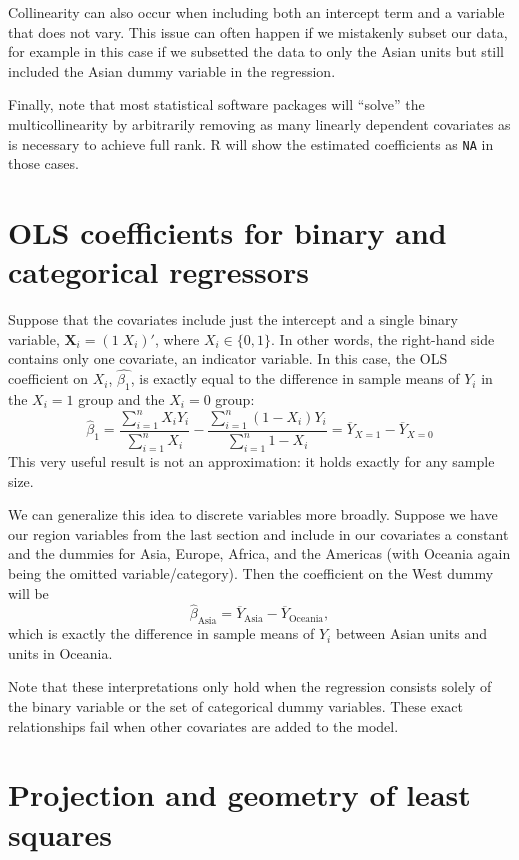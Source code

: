 \documentclass[
  13pt,
  letterpaper,
  DIV=11,
  numbers=noendperiod]{scrreprt}
\newcommand{\mb}{\symbf}
\newcommand{\X}{\mb{X}}
\theoremstyle{plain}
\theoremstyle{definition}
\theoremstyle{definition}
\theoremstyle{remark}
\begin{document}
Collinearity can also occur when including both an intercept term and a
variable that does not vary. This issue can often happen if we
mistakenly subset our data, for example in this case if we subsetted the
data to only the Asian units but still included the Asian dummy variable
in the regression.

Finally, note that most statistical software packages will ``solve'' the
multicollinearity by arbitrarily removing as many linearly dependent
covariates as is necessary to achieve full rank. R will show the
estimated coefficients as \texttt{NA} in those cases.

\section{OLS coefficients for binary and categorical
regressors}\label{ols-coefficients-for-binary-and-categorical-regressors}

Suppose that the covariates include just the intercept and a single
binary variable, \(\X_i = (1\; X_{i})'\), where \(X_i \in \{0,1\}\). In
other words, the right-hand side contains only one covariate, an
indicator variable. In this case, the OLS coefficient on \(X_i\),
\(\widehat{\beta_{1}}\), is exactly equal to the difference in sample
means of \(Y_i\) in the \(X_i = 1\) group and the \(X_i = 0\) group: \[ 
\widehat{\beta}_{1} = \frac{\sum_{i=1}^{n} X_{i}Y_{i}}{\sum_{i=1}^{n} X_{i}} - \frac{\sum_{i=1}^{n} (1 - X_{i})Y_{i}}{\sum_{i=1}^{n} 1- X_{i}} = \overline{Y}_{X =1} - \overline{Y}_{X=0}
\] This very useful result is not an approximation: it holds exactly for
any sample size.

We can generalize this idea to discrete variables more broadly. Suppose
we have our region variables from the last section and include in our
covariates a constant and the dummies for Asia, Europe, Africa, and the
Americas (with Oceania again being the omitted variable/category). Then
the coefficient on the West dummy will be \[ 
\widehat{\beta}_{\text{Asia}} = \overline{Y}_{\text{Asia}} - \overline{Y}_{\text{Oceania}},
\] which is exactly the difference in sample means of \(Y_i\) between
Asian units and units in Oceania.

Note that these interpretations only hold when the regression consists
solely of the binary variable or the set of categorical dummy variables.
These exact relationships fail when other covariates are added to the
model.

\section{Projection and geometry of least
squares}\label{projection-and-geometry-of-least-squares}
\end{document}

